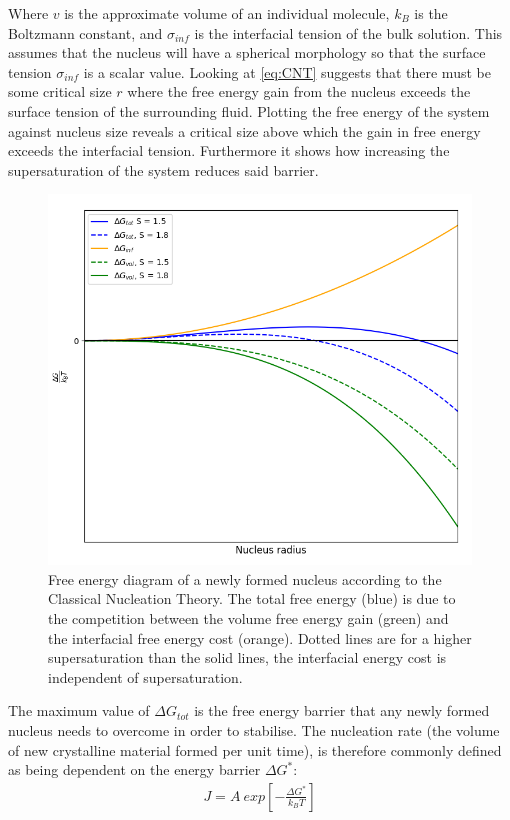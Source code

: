 Where $v$ is the approximate volume of an individual molecule, $k_B$ is 
the Boltzmann constant, and $\sigma_{inf}$ is the interfacial tension of 
the bulk solution. This assumes that the nucleus will have a spherical 
morphology so that the surface tension $\sigma_{inf}$ is a scalar value. 
Looking at \eqref{eq:CNT} suggests that there must be some critical size 
$r$ where the free energy gain from the nucleus exceeds the surface tension 
of the surrounding fluid. Plotting the free energy of the system against 
nucleus size reveals a critical size above which the gain in free energy 
exceeds the interfacial tension. Furthermore it shows how increasing the 
supersaturation of the system reduces said barrier. 
\begin{figure}[h!]
	\centering
	\includegraphics[width=\linewidth]{Free_Energy_Diagram.png}
	\caption{Free energy diagram of a newly formed nucleus according 
		     to the Classical Nucleation Theory. The total free energy (blue)
		     is due to the competition between the volume free energy gain
		     (green) and the interfacial free energy cost (orange). Dotted
		     lines are for a higher supersaturation than the solid lines,
		     the interfacial energy cost is independent of supersaturation.}
	\label{fig:free_energy}
\end{figure}

The maximum value of $\Delta G_{tot}$ is the free energy barrier that any 
newly formed nucleus needs to overcome in order to stabilise. The nucleation 
rate (the volume of new crystalline material formed per unit time), is 
therefore commonly defined as being dependent on the energy barrier $\Delta G^*$:
\begin{align}
	J = A \ exp \left[-\frac{\Delta G^*}{k_BT} \right]
\end{align}

